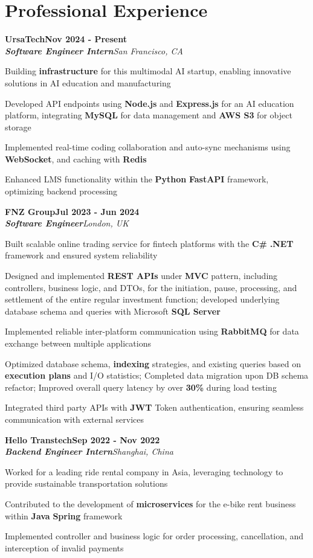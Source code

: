 \documentclass[letterpaper,10pt]{article}
\newcommand{\heading}[2]{
  \hspace{10pt}#1\hfill#2\\
}
\newcommand{\headingBf}[2]{
  \heading{\textbf{#1}}{\textbf{#2}}
}
\newcommand{\headingIt}[2]{
  \heading{\textit{#1}}{\textit{#2}}
}
\newenvironment{resume_list}{
  \vspace{-7pt}
  \begin{itemize}[itemsep=-2px, parsep=1pt, leftmargin=30pt]
}{
  \end{itemize}
}
\begin{document}
  \section{Professional Experience}
  \headingBf{UrsaTech} {Nov 2024 - Present}
  \headingIt{\textbf{Software Engineer Intern}}{San Francisco, CA}
  \begin{resume_list}
      \item Building \textbf{infrastructure} for this multimodal AI startup, enabling innovative solutions in AI education and manufacturing
      \item Developed API endpoints using \textbf{Node.js }and\textbf{ Express.js} for an AI education platform, integrating \textbf{MySQL} for data management and \textbf{AWS S3} for object storage
      \item Implemented real-time coding collaboration and auto-sync mechanisms using \textbf{WebSocket}, and caching with \textbf{Redis}
      \item Enhanced LMS functionality within the \textbf{Python} \textbf{FastAPI} framework, optimizing backend processing
  \end{resume_list}
  \headingBf{FNZ Group}{Jul 2023 - Jun 2024}
  \headingIt{\textbf{Software Engineer}}{London, UK}
  \begin{resume_list}
    \item Built scalable online trading service for fintech platforms with the \textbf{C\#} \textbf{.NET} framework and ensured system reliability
    \item Designed and implemented \textbf{REST APIs} under \textbf{MVC} pattern, including controllers, business logic, and DTOs, for the initiation, pause, processing, and settlement of the entire regular investment function; developed underlying database schema and queries with Microsoft \textbf{SQL Server}
    \item Implemented reliable inter-platform communication using \textbf{RabbitMQ} for data exchange between multiple applications
    \item Optimized database schema, \textbf{indexing} strategies, and existing queries based on \textbf{execution plans} and I/O statistics; Completed data migration upon DB schema refactor; Improved overall query latency by over \textbf{30\%} during load testing
    \item Integrated third party APIs with \textbf{JWT} Token authentication, ensuring seamless communication with external services
  \end{resume_list}
  \headingBf{Hello Transtech}{Sep 2022 - Nov 2022}
  \headingIt{\textbf{Backend Engineer Intern}}{Shanghai, China}
  \begin{resume_list}
  \item Worked for a leading ride rental company in Asia, leveraging technology to provide sustainable transportation solutions
  \item Contributed to the development of \textbf{microservices} for the e-bike rent business within \textbf{Java} \textbf{Spring} framework
  \item Implemented controller and business logic for order processing, cancellation, and interception of invalid payments
  \end{resume_list}
\end{document}

